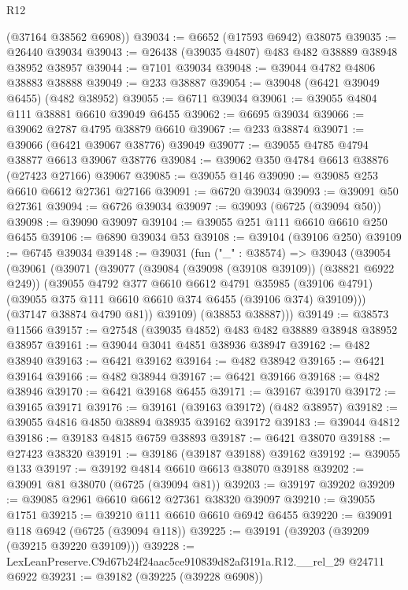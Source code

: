 \begin{lexlean}{R12}
\begin{coremodule}
      (@37164 @38562 @6908))
@39034 := @6652 (@17593 @6942) @38075
@39035 := @26440 @39034
@39043 := @26438 (@39035 @4807) @483 @482 @38889 @38948 @38952 @38957
@39044 := @7101 @39034
@39048 := @39044 @4782 @4806 @38883 @38888
@39049 := @233 @38887
@39054 := @39048 (@6421 @39049 @6455) (@482 @38952)
@39055 := @6711 @39034
@39061 := @39055 @4804 @111 @38881 @6610 @39049 @6455
@39062 := @6695 @39034
@39066 := @39062 @2787 @4795 @38879 @6610
@39067 := @233 @38874
@39071 := @39066 (@6421 @39067 @38776) @39049
@39077 := @39055 @4785 @4794 @38877 @6613 @39067 @38776
@39084 := @39062 @350 @4784 @6613 @38876 (@27423 @27166) @39067
@39085 := @39055 @146
@39090 := @39085 @253 @6610 @6612 @27361 @27166
@39091 := @6720 @39034
@39093 := @39091 @50 @27361
@39094 := @6726 @39034
@39097 := @39093 (@6725 (@39094 @50))
@39098 := @39090 @39097
@39104 := @39055 @251 @111 @6610 @6610 @250 @6455
@39106 := @6890 @39034 @53
@39108 := @39104 (@39106 @250)
@39109 := @6745 @39034
@39148 := @39031
    (fun ("_" : @38574) =>
    @39043
      (@39054
        (@39061
          (@39071
            (@39077
              (@39084 (@39098 (@39108 @39109)) (@38821 @6922 @249))
              (@39055
                @4792
                @377
                @6610
                @6612
                @4791
                @35985
                (@39106 @4791)
                (@39055 @375 @111 @6610 @6610 @374 @6455 (@39106 @374) @39109)))
            (@37147 @38874 @4790 @81))
          @39109)
        (@38853 @38887)))
@39149 := @38573 @11566
@39157 := @27548 (@39035 @4852) @483 @482 @38889 @38948 @38952 @38957
@39161 := @39044 @3041 @4851 @38936 @38947
@39162 := @482 @38940
@39163 := @6421 @39162
@39164 := @482 @38942
@39165 := @6421 @39164
@39166 := @482 @38944
@39167 := @6421 @39166
@39168 := @482 @38946
@39170 := @6421 @39168 @6455
@39171 := @39167 @39170
@39172 := @39165 @39171
@39176 := @39161 (@39163 @39172) (@482 @38957)
@39182 := @39055 @4816 @4850 @38894 @38935 @39162 @39172
@39183 := @39044 @4812
@39186 := @39183 @4815 @6759 @38893
@39187 := @6421 @38070
@39188 := @27423 @38320
@39191 := @39186 (@39187 @39188) @39162
@39192 := @39055 @133
@39197 := @39192 @4814 @6610 @6613 @38070 @39188
@39202 := @39091 @81 @38070 (@6725 (@39094 @81))
@39203 := @39197 @39202
@39209 := @39085 @2961 @6610 @6612 @27361 @38320 @39097
@39210 := @39055 @1751
@39215 := @39210 @111 @6610 @6610 @6942 @6455
@39220 := @39091 @118 @6942 (@6725 (@39094 @118))
@39225 := @39191 (@39203 (@39209 (@39215 @39220 @39109)))
@39228 := LexLeanPreserve.C9d67b24f24aac5ce910839d82af3191a.R12.__rel_29 @24711 @6922
@39231 := @39182 (@39225 (@39228 @6908))

\end{coremodule}
\end{lexlean}
